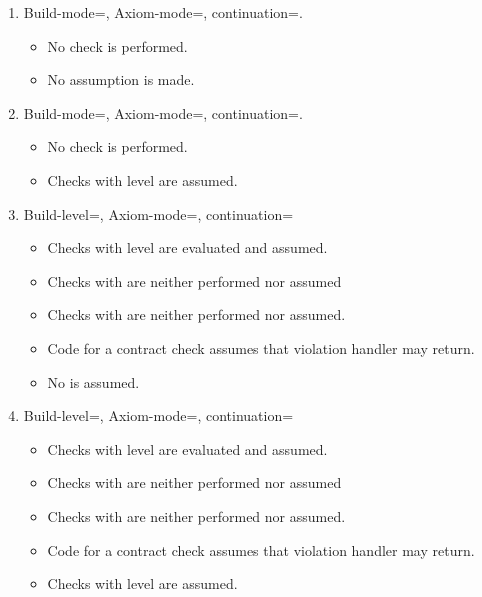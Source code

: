 \begin{enumerate}

\item Build-mode=, Axiom-mode=, continuation=.
\begin{itemize}
  \item No check is performed.
  \item No assumption is made.
\end{itemize}

\item Build-mode=, Axiom-mode=, continuation=.
\begin{itemize}
  \item No check is performed.
  \item Checks with  level are assumed.
\end{itemize}

\item Build-level=, Axiom-mode=, continuation=
\begin{itemize}
  \item Checks with  level are evaluated and assumed.
  \item Checks with  are neither performed nor assumed
  \item Checks with  are neither performed nor assumed.
  \item Code for a  contract check assumes that violation handler
	  may return.
  \item No  is assumed.
\end{itemize}

\item Build-level=, Axiom-mode=, continuation=
\begin{itemize}
  \item Checks with  level are evaluated and assumed.
  \item Checks with  are neither performed nor assumed
  \item Checks with  are neither performed nor assumed.
  \item Code for a  contract check assumes that violation handler
	  may return.
  \item Checks with  level are assumed.
\end{itemize}


\end{enumerate}
